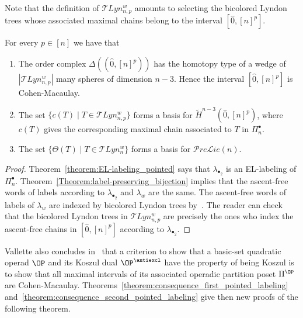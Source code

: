      \begin{rema}
         Note that the definition of $\mathcal{T}Lyn_{n,p}^{w}$ amounts to selecting the bicolored Lyndon trees whose associated maximal chains belong to the interval $[\hat{0},[n]^p]$.
     \end{rema}
    
\begin{theo}\label{theorem:consequence_second_pointed_labeling} 
  For every $p\in [n]$ we have that
 \begin{enumerate}
   \item   The order complex $\Delta((\hat{0},[n]^p))$ has the homotopy type of a wedge of $|\mathcal{T}Lyn_{n,p}^{w}|$  many spheres of dimension $n-3$. Hence the interval $[\hat{0},[n]^p]$ is Cohen-Macaulay.

\item The set
$ \{c(T) \mid T\in \mathcal{T}Lyn_{n,p}^{w}\}$ forms a basis for $\widetilde H^{n-3}(\hat{0},[n]^p)$, where $c(T)$ gives the corresponding maximal chain associated to $T$ in $\Pi_n^{\bullet}$.

\item The set
$\{\Theta(T) \mid T\in \mathcal{T}Lyn_{n}^{w}\}$ forms a basis for $\mathcal{P}re\mathcal{L}ie(n)$.
 \end{enumerate}
\end{theo}

\begin{proof}
Theorem~\ref{theorem:EL-labeling_pointed} says that  $\lambda_{\bullet_2}$ is an EL-labeling of $\Pi_n^{\bullet}$. Theorem~\ref{Theorem:label-preserving_bijection} implies that the ascent-free words of labels according to $\lambda_{\bullet_2}$ and $\lambda_{w}$ are the same. The ascent-free words of labels of $\lambda_{w}$ are indexed by bicolored Lyndon trees by~\cite[Theorem 5.7]{GonzalezDleonWachs2016}. The reader can check that the bicolored Lyndon trees in $\mathcal{T}Lyn_{n,p}^{w}$ are precisely the ones who index the ascent-free chains in $[\hat{0},[n]^p]$ according to $\lambda_{\bullet_2}$.
\end{proof}

Vallette also concludes in~\cite[Theorem 9]{Vallette2007} that a criterion to show that a basic-set quadratic operad $\OP$ and its Koszul dual $\OP^{\antiexcl}$ have the property of being Koszul is to show that all maximal intervals of its associated operadic partition poset $\Pi^{\OP}$ are Cohen-Macaulay. Theorems~\ref{theorem:consequence_first_pointed_labeling} and~\ref{theorem:consequence_second_pointed_labeling} give then new proofs of the following theorem.

